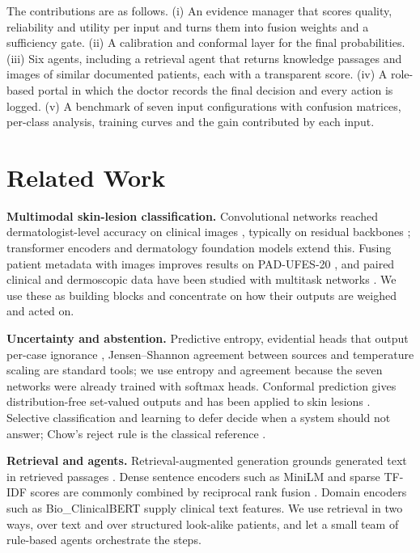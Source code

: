\documentclass[conference]{IEEEtran}
\begin{document}
The contributions are as follows. (i) An evidence manager that scores quality, reliability and utility per input and turns them into fusion weights and a sufficiency gate. (ii) A calibration and conformal layer for the final probabilities. (iii) Six agents, including a retrieval agent that returns knowledge passages and images of similar documented patients, each with a transparent score. (iv) A role-based portal in which the doctor records the final decision and every action is logged. (v) A benchmark of seven input configurations with confusion matrices, per-class analysis, training curves and the gain contributed by each input.

\section{Related Work}
\textbf{Multimodal skin-lesion classification.} Convolutional networks reached dermatologist-level accuracy on clinical images \cite{esteva2017}, typically on residual backbones \cite{he2016}; transformer encoders \cite{dosovitskiy2021} and dermatology foundation models \cite{yan2025} extend this. Fusing patient metadata with images improves results on PAD-UFES-20 \cite{pacheco2021}, and paired clinical and dermoscopic data have been studied with multitask networks \cite{kawahara2019}. We use these as building blocks and concentrate on how their outputs are weighed and acted on.

\textbf{Uncertainty and abstention.} Predictive entropy, evidential heads that output per-case ignorance \cite{sensoy2018}, Jensen--Shannon agreement between sources \cite{lin1991} and temperature scaling \cite{guo2017} are standard tools; we use entropy and agreement because the seven networks were already trained with softmax heads. Conformal prediction gives distribution-free set-valued outputs \cite{vovk2005,angelopoulos2021} and has been applied to skin lesions \cite{fayyad2024}. Selective classification \cite{geifman2017} and learning to defer \cite{mozannar2020} decide when a system should not answer; Chow's reject rule is the classical reference \cite{chow1970}.

\textbf{Retrieval and agents.} Retrieval-augmented generation grounds generated text in retrieved passages \cite{lewis2020}. Dense sentence encoders such as MiniLM \cite{wang2020} and sparse TF-IDF scores are commonly combined by reciprocal rank fusion \cite{cormack2009}. Domain encoders such as Bio\_ClinicalBERT \cite{alsentzer2019} supply clinical text features. We use retrieval in two ways, over text and over structured look-alike patients, and let a small team of rule-based agents orchestrate the steps.
\end{document}
